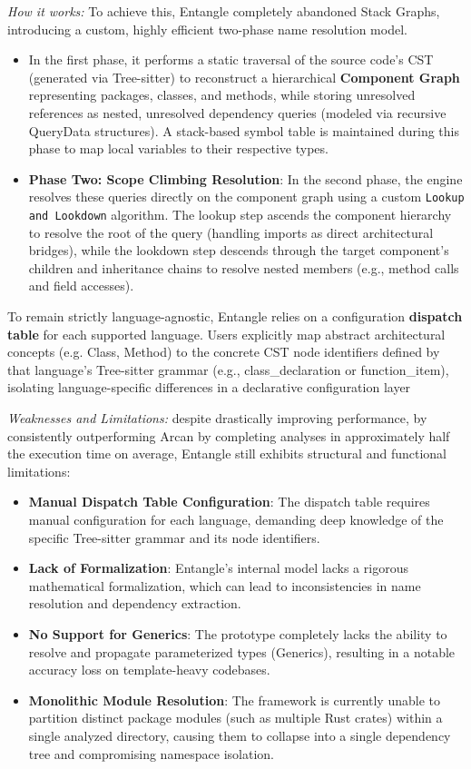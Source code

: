 \textit{How it works:} To achieve this, Entangle completely abandoned
Stack Graphs, introducing a custom, highly efficient two-phase name
resolution model.
\begin{itemize}
  \item In the first phase, it performs a static traversal of the
    source code's CST (generated via Tree-sitter) to reconstruct a
    hierarchical \textbf{Component Graph} representing packages,
    classes, and methods, while storing unresolved references as
    nested, unresolved dependency queries (modeled via recursive
    QueryData structures). A stack-based symbol table is maintained
    during this phase to map local variables to their respective types.
  \item \textbf{Phase Two: Scope Climbing Resolution}: In the second
    phase, the engine resolves these queries directly on the
    component graph using a custom \texttt{Lookup and Lookdown}
    algorithm. The lookup step ascends the component hierarchy to
    resolve the root of the query (handling imports as direct
    architectural bridges), while the lookdown step descends through
    the target component's children and inheritance chains to resolve
    nested members (e.g., method calls and field accesses).
\end{itemize}

To remain strictly language-agnostic, Entangle relies on a
configuration \textbf{dispatch table} for each supported language.
Users explicitly map abstract architectural concepts (e.g. Class,
Method) to the concrete CST node identifiers defined by that
language's Tree-sitter grammar (e.g., class\_declaration or
function\_item), isolating language-specific differences in a
declarative configuration layer

\textit{Weaknesses and Limitations:} despite drastically improving
performance, by consistently outperforming Arcan by completing
analyses in approximately half the execution time on average,
Entangle still exhibits structural and functional limitations:

\begin{itemize}
  \item \textbf{Manual Dispatch Table Configuration}: The dispatch
    table requires manual configuration for each language, demanding
    deep knowledge of the specific Tree-sitter grammar and its node
    identifiers.
  \item \textbf{Lack of Formalization}: Entangle's internal model
    lacks a rigorous mathematical formalization, which can lead to
    inconsistencies in name resolution and dependency extraction.
  \item \textbf{No Support for Generics}: The prototype completely
    lacks the ability to resolve and propagate parameterized types
    (Generics), resulting in a notable accuracy loss on
    template-heavy codebases.
  \item \textbf{Monolithic Module Resolution}: The framework is
    currently unable to partition distinct package modules (such as
    multiple Rust crates) within a single analyzed directory, causing
    them to collapse into a single dependency tree and compromising
    namespace isolation.
\end{itemize}

